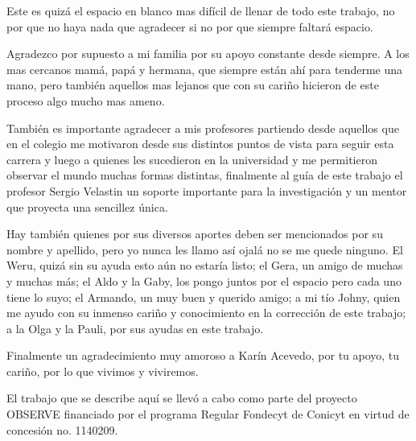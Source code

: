 
\begin{gracias}

Este es quizá el espacio en blanco mas difícil de llenar de todo este trabajo, no por que no haya nada que agradecer si no por que siempre faltará espacio.

Agradezco por supuesto a mi familia por su apoyo constante desde siempre. A los mas cercanos mamá, papá y hermana, que siempre están ahí para tenderme una mano, pero también aquellos mas lejanos que con su cariño hicieron de este proceso algo mucho mas ameno.

También es importante agradecer a mis profesores partiendo desde aquellos que en el colegio me motivaron desde sus distintos puntos de vista para seguir esta carrera y luego a quienes les sucedieron en la universidad y me permitieron observar el mundo muchas formas distintas, finalmente al guía de este trabajo el profesor Sergio Velastin un soporte importante para la investigación y un mentor que proyecta una sencillez única. 

Hay también quienes por sus diversos aportes deben ser mencionados por su nombre y apellido, pero yo nunca les llamo así ojalá no se me quede ninguno. El Weru, quizá sin su ayuda esto aún no estaría listo; el Gera, un amigo de muchas y muchas más; el Aldo y la Gaby, los pongo juntos por el espacio pero cada uno tiene lo suyo; el Armando, un muy buen y querido amigo; a mi tío Johny, quien me ayudo con su inmenso cariño y conocimiento en la corrección de este trabajo; a la Olga y la Pauli, por sus ayudas en este trabajo.

Finalmente un agradecimiento muy amoroso a Karín Acevedo, por tu apoyo, tu cariño, por lo que vivimos y viviremos.

El trabajo que se describe aquí se llevó a cabo como parte del proyecto OBSERVE financiado por el programa Regular Fondecyt de Conicyt en virtud de concesión no. 1140209.
\paginaenblanco
\end{gracias}